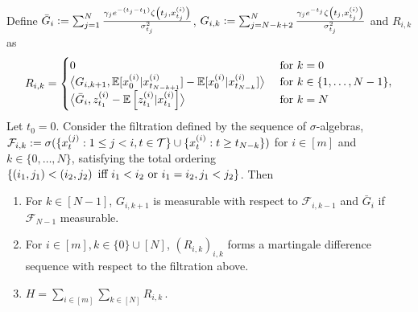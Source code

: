 \begin{lemma}\label{lemma:error_martingale_decomposition_2_actual_appendix}

Define $\bar{G}_i := \sum_{j=1}^{N} \tfrac{\gamma_{j}e^{-(t_j-t_1)}\zeta\left(t_j,x_{t_j}^{(i)}\right)}{\sigma_{t_j}^{2}}$, $G_{i,k} := \sum_{j = N-k+2}^{N} \tfrac{\gamma_{j}e^{-t_j}\zeta\left(t_j,x_{t_j}^{(i)}\right)}{\sigma_{t_j}^{2}}$ and $R_{i,k}$ as  
    \begin{equation}
    R_{i,k} = \begin{cases} 0 &\text{ for } k = 0\\ \bigr \langle G_{i,k+1},\mathbb{E}[x_0^{(i)}|x_{t_{N-k+1}}^{(i)}]-\mathbb{E}[x_0^{(i)}|x_{t_{N-k}}^{(i)}]\bigr \rangle &\text{ for }  k \in \{1,\dots,N-1\}, \\ 
     \bigr\langle \bar{G}_i , z_{t_1}^{(i)}-\mathbb{E}\left[z_{t_1}^{(i)}|x_{t_1}^{(i)}\right]\bigr\rangle &\text{ for } k = N \end{cases} 
    \end{equation}
    Let $t_0 = 0$. Consider the filtration defined by the sequence of $\sigma$-algebras,  $\mathcal{F}_{i,k} := \sigma(\{x_{t}^{(j)} : 1\leq j < i, t \in \mathcal{T}\}\cup \{x_{t}^{(i)} : t \geq t_{N-k}\})$ for $i \in [m]$ and $k \in \{0,\dots, N\}$, satisfying the total ordering $\left\{\left(i_1, j_1\right) < \left(i_2, j_2\right) \text{ iff } i_1 < i_2 \text{ or } i_1 = i_2, j_1 < j_2\right\}$. Then 
    \begin{enumerate}
        \item For $k \in [N-1]$, $G_{i,k+1}$ is measurable with respect to $\mathcal{F}_{i,k-1}$ and $\bar{G}_{i}$ if $\mathcal{F}_{N-1}$ measurable.
        \item For $i \in [m], k \in \{0\}\cup[N]$,  $(R_{i,k})_{i,k}$ forms a martingale difference sequence with respect to the filtration above. 
        \item $H = \sum_{i \in [m]}\sum_{k \in [N]}R_{i,k}\,.$ 
    \end{enumerate}
    

    
\end{lemma}
